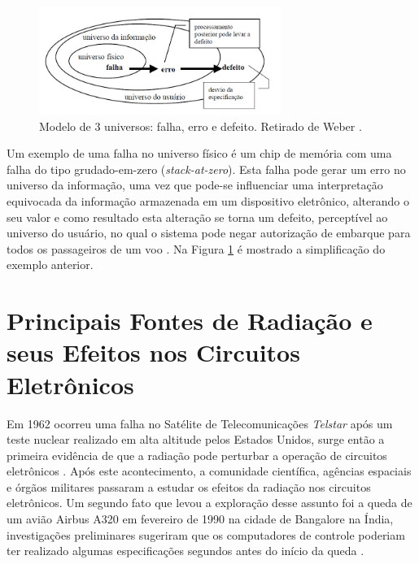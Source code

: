 \begin{figure}[H]
	\centering
	\includegraphics[width=0.7\textwidth]{figuras/modeloUniverso.jpg}
	\caption[Modelo de três universos]{Modelo de 3 universos: falha, erro e defeito. Retirado de Weber \cite{Weber:2002}.}
	\label{Img:modeloUniverso}	
\end{figure}

Um exemplo de uma falha no universo físico é um chip de memória com uma falha do tipo grudado-em-zero (\textit{stack-at-zero}). Esta falha pode gerar um erro no universo da informação, uma vez que pode-se influenciar uma interpretação equivocada da informação armazenada em um dispositivo eletrônico, alterando o seu valor e como resultado esta alteração se torna um defeito, perceptível ao universo do usuário, no qual o sistema pode negar autorização de embarque para todos os passageiros de um voo \cite{Nelson:1990}. Na Figura \ref{Img:modeloUniverso} é mostrado a simplificação do exemplo anterior.

\section{Principais Fontes de Radiação e seus Efeitos nos Circuitos Eletrônicos} \label{sec:radiacao}

Em 1962 ocorreu uma falha no Satélite de Telecomunicações \textit{Telstar} após um teste nuclear realizado em alta altitude pelos Estados Unidos, surge então a primeira evidência de que a radiação pode perturbar a operação de circuitos eletrônicos \cite{Velazco:2007}. Após este acontecimento, a comunidade científica, agências espaciais e órgãos militares passaram a estudar os efeitos da radiação nos circuitos eletrônicos. Um segundo fato que levou a exploração desse assunto foi a queda de um avião Airbus A320 em fevereiro de 1990 na cidade de Bangalore na Índia, investigações preliminares sugeriram que os computadores de controle poderiam ter realizado algumas especificações segundos antes do início da queda \cite{LaprieAcidente:1990}.

